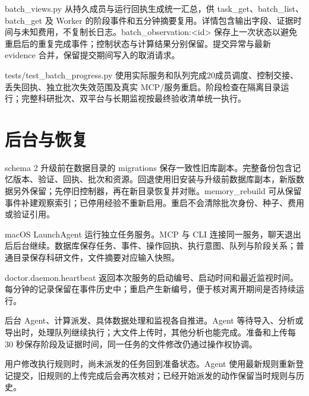 \documentclass[11pt,a4paper]{ctexart}
\begin{document}
batch\_\allowbreak{}views.py 从持久成员与运行回执生成统一汇总，供 task\_\allowbreak{}get、batch\_\allowbreak{}list、batch\_\allowbreak{}get 及 Worker 的阶段事件和五分钟摘要复用。详情包含输出字段、证据时间与未知费用，不复制长日志。batch\_\allowbreak{}observation:<id> 保存上一次状态以避免重启后的重复完成事件；控制状态与计算结果分别保留。提交异常与最新 evidence 合并，保留提交期间写入的取消请求。



tests/\allowbreak{}test\_\allowbreak{}batch\_\allowbreak{}progress.py 使用实际服务和队列完成20成员调度、控制交接、丢失回执、独立批次失效范围及真实 MCP/\allowbreak{}服务重启。阶段检查在隔离目录运行；完整科研批次、双平台与长期监视按最终验收清单统一执行。

\clearpage
\section{后台与恢复}


schema 2 升级前在数据目录的 migrations 保存一致性旧库副本。完整备份包含记忆版本、验证、回执、批次和资源。回退使用旧安装与升级前数据库副本，新版数据另外保留；先停旧控制器，再在新目录恢复并对账。memory\_\allowbreak{}rebuild 可从保留事件补建观察索引；已停用经验不重新启用。重启不会清除批次身份、种子、费用或验证引用。



macOS LaunchAgent 运行独立任务服务。MCP 与 CLI 连接同一服务，聊天退出后后台继续。数据库保存任务、事件、操作回执、执行意图、队列与阶段关系；普通目录保存科研文件，文件摘要对应输入快照。



doctor.daemon.heartbeat 返回本次服务的启动编号、启动时间和最近监视时间。每分钟的记录保留在事件历史中；重启产生新编号，便于核对离开期间是否持续运行。



后台 Agent、计算派发、具体数据处理和监视各自推进。Agent 等待导入、分析或导出时，处理队列继续执行；大文件上传时，其他分析也能完成。准备和上传每 30 秒保存阶段及证据时间，同一任务的文件修改仍通过操作权协调。



用户修改执行规则时，尚未派发的任务回到准备状态。Agent 使用最新规则重新登记提交，旧规则的上传完成后会再次核对；已经开始派发的动作保留当时规则与历史。
\end{document}
